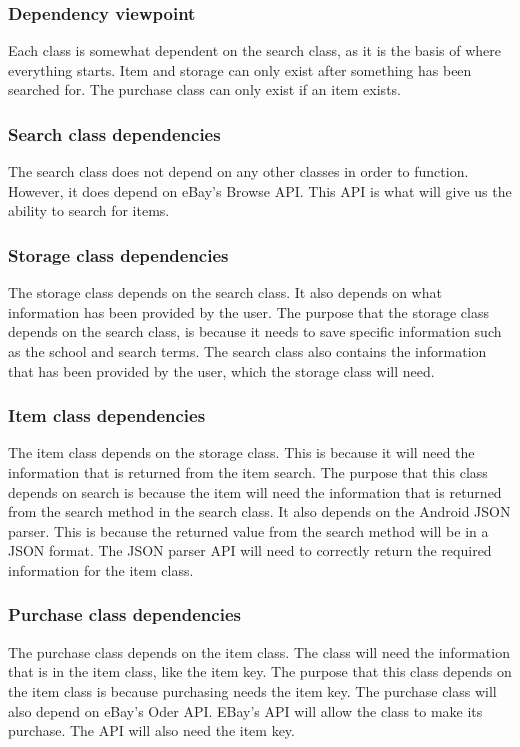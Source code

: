 \documentclass[journal,compsoc, 10pt, draftclsnofoot, onecolumn]{IEEEtran}
\begin{document}
\subsubsection{Dependency viewpoint}
Each class is somewhat dependent on the search class, as it is the basis of 
where everything starts. Item and storage can only exist after something has 
been searched for. The purchase class can only exist if an item exists.

\subsubsection*{Search class dependencies}
The search class does not depend on any other classes in order to function. 
However, it does depend on eBay's Browse API. This API is what will give us the 
ability to search for items.

\subsubsection*{Storage class dependencies}
The storage class depends on the search class. It also depends on what 
information has been provided by the user. The purpose that the storage class 
depends on the search class, is because it needs to save specific information 
such as the school and search terms. The search class also contains the information 
that has been provided by the user, which the storage class will need. 

\subsubsection*{Item class dependencies}
The item class depends on the storage class. This is because it will need 
the information that is returned from the item search. The purpose that this 
class depends on search is because the item will need the information that is 
returned from the search method in the search class. It also depends on the 
Android JSON parser. This is because the returned value from the search method 
will be in a JSON format. The JSON parser API will need to correctly return the 
required information for the item class.

\subsubsection*{Purchase class dependencies}
The purchase class depends on the item class. The class will need the 
information that is in the item class, like the item key. The purpose that this 
class depends on the item class is because purchasing needs the item key. The 
purchase class will also depend on eBay's Oder API. EBay's API will allow the 
class to make its purchase. The API will also need the item key. 
\end{document}
